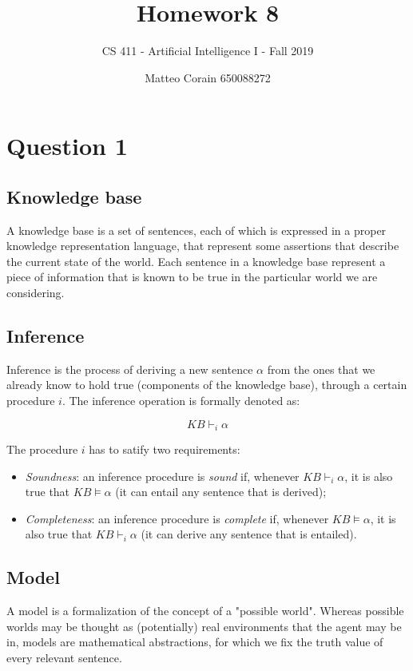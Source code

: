 \documentclass[letterpaper,headings=standardclasses]{scrartcl}
\title{Homework 8}
\subtitle{CS 411 - Artificial Intelligence I - Fall 2019}
\author{Matteo Corain 650088272}
\begin{document}
\maketitle

\section{Question 1}

\subsection{Knowledge base}

A knowledge base is a set of sentences, each of which is expressed in a proper knowledge representation language, that represent some assertions that describe the current state of the world. Each sentence in a knowledge base represent a piece of information that is known to be true in the particular world we are considering.

\subsection{Inference}

Inference is the process of deriving a new sentence $\alpha$ from the ones that we already know to hold true (components of the knowledge base), through a certain procedure $i$. The inference operation is formally denoted as:

$$ KB \vdash_i \alpha $$

The procedure $i$ has to satify two requirements:

\begin{itemize}
    \item \emph{Soundness}: an inference procedure is \emph{sound} if,	whenever $ KB \vdash_i \alpha $, it is also true that $ KB \models \alpha $ (it can entail any sentence that is derived);
    \item \emph{Completeness}: an inference procedure is \emph{complete} if, whenever $ KB \models \alpha $, it is also true that $ KB \vdash_i \alpha $ (it can derive any sentence that is entailed).
\end{itemize}

\subsection{Model}

A model is a formalization of the concept of a "possible world". Whereas possible worlds may be thought as (potentially) real environments that the agent may be in, models are mathematical abstractions, for which we fix the truth value of every relevant sentence.
\end{document}
